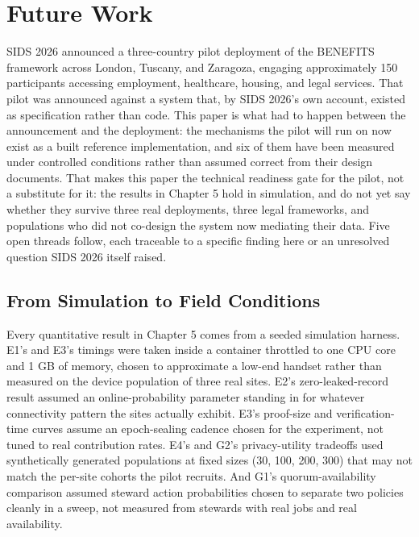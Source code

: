 \section{Future Work}

SIDS 2026 \cite{katrakazas2026} announced a three-country pilot deployment of the BENEFITS framework across London, Tuscany, and Zaragoza, engaging approximately 150 participants accessing employment, healthcare, housing, and legal services. That pilot was announced against a system that, by SIDS 2026's own account, existed as specification rather than code. This paper is what had to happen between the announcement and the deployment: the mechanisms the pilot will run on now exist as a built reference implementation, and six of them have been measured under controlled conditions rather than assumed correct from their design documents. That makes this paper the technical readiness gate for the pilot, not a substitute for it: the results in Chapter 5 hold in simulation, and do not yet say whether they survive three real deployments, three legal frameworks, and populations who did not co-design the system now mediating their data. Five open threads follow, each traceable to a specific finding here or an unresolved question SIDS 2026 itself raised.

\subsection{From Simulation to Field Conditions}

Every quantitative result in Chapter 5 comes from a seeded simulation harness. E1's and E3's timings were taken inside a container throttled to one CPU core and 1 GB of memory, chosen to approximate a low-end handset rather than measured on the device population of three real sites. E2's zero-leaked-record result assumed an online-probability parameter standing in for whatever connectivity pattern the sites actually exhibit. E3's proof-size and verification-time curves assume an epoch-sealing cadence chosen for the experiment, not tuned to real contribution rates. E4's and G2's privacy-utility tradeoffs used synthetically generated populations at fixed sizes (30, 100, 200, 300) that may not match the per-site cohorts the pilot recruits. And G1's quorum-availability comparison assumed steward action probabilities chosen to separate two policies cleanly in a sweep, not measured from stewards with real jobs and real availability.

